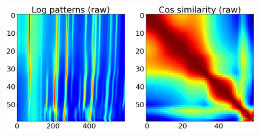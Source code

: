 \documentclass[12pt]{iopart}
\begin{document}
\begin{figure}
  \includegraphics[width=\linewidth]{paper_figures/1/raw_with_similarity.png}
  \caption{}
  \label{fig:noise}
\end{figure}
\end{document}
